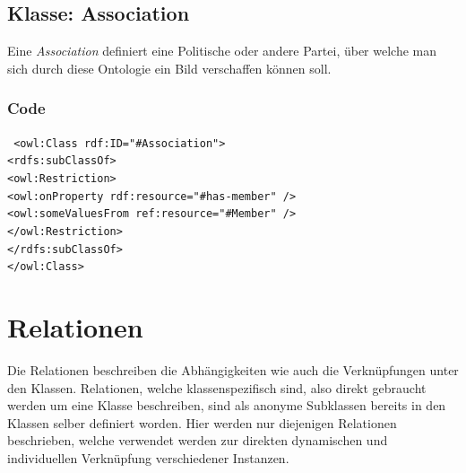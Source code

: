 ﻿\documentclass[
    11pt,
    latin1,
    a4paper,
    oneside
]{scrreprt}
\begin{document}
\subsection{Klasse: Association} \label{sec:class_association}

Eine \emph{Association} definiert eine Politische oder andere Partei, über welche man sich durch diese Ontologie ein Bild verschaffen k\"onnen soll.

\subsubsection{Code} \label{sec:class_association_code}

\texttt{ <owl:Class rdf:ID="#Association"> \\
	<rdfs:subClassOf> \\
		<owl:Restriction> \\
			<owl:onProperty rdf:resource="#has-member" /> \\
			<owl:someValuesFrom ref:resource="#Member" /> \\
		</owl:Restriction> \\
	</rdfs:subClassOf> \\
</owl:Class> }


\section{Relationen} \label{\sec:reltations}

Die Relationen beschreiben die Abh\"angigkeiten wie auch die Verkn\"upfungen unter den Klassen. Relationen, welche klassenspezifisch sind, also direkt gebraucht werden um eine Klasse beschreiben, sind als anonyme Subklassen bereits in den Klassen selber definiert worden. Hier werden nur diejenigen Relationen beschrieben, welche verwendet werden zur direkten dynamischen und individuellen Verknüpfung verschiedener Instanzen.
\end{document}
